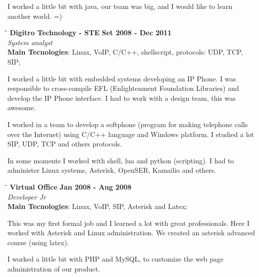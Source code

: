 \documentclass[margin]{res}
\begin{document}
\begin{resume}
    I worked a little bit with java, our team was big, and I would like to learn another world. =)
    
    \vspace{22mm}

   \begin{tabbing}
   \hspace{2.3in}\= \hspace{1.5in}\= \kill %
    \textbf{Digitro Technology - STE}    \>\>\textbf{Set 2008 - Dec 2011}\\
    \textit{System analyst}\\   
    \textbf{Main Tecnologies}: Linux, VoIP, C/C++, shellscript, protocols: UDP, TCP, SIP;
   \end{tabbing}\vspace{-20pt}      %
    \vspace{2mm}
    I worked a little bit with embedded systems developing an IP Phone. I was responsible to cross-compile EFL
    (Enlightenment Foundation Libraries) and develop the IP Phone interface. I had to work with a design team,
    this was awesome.

    I worked in a team to develop a softphone (program for making telephone calls over the Internet) using C/C++
    language and Windows platform. I studied a lot SIP, UDP, TCP and others protocols.

    In some moments I worked with shell, lua and python (scripting). I had to administer Linux systems, 
    Asterisk, OpenSER, Kamailio and others.

   \begin{tabbing}
   \hspace{2.3in}\= \hspace{1.5in}\= \kill %
    \textbf{Virtual Office}    \>\>\textbf{Jan 2008 - Aug 2008}\\
    \textit{Developer Jr}\\
    \textbf{Main Tecnologies}: Linux, VoIP, SIP, Asterisk and Latex;
   \end{tabbing}\vspace{-20pt}      %
    \vspace{2mm}
     This was my first formal job and I learned a lot with great professionals. Here I worked with
     Asterisk and Linux administration. We created an asterisk advanced course (using latex). 

     I worked a little bit with PHP and MySQL, to customize the web page administration of our product.


\end{resume}
\end{document}
